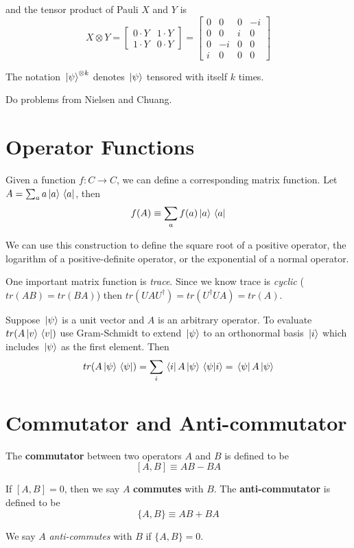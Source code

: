 and the tensor product of Pauli $X$ and $Y$ is 
$$X \otimes Y = \begin{bmatrix}
0 \cdot Y & 1 \cdot Y \\
1 \cdot Y & 0 \cdot Y
\end{bmatrix} = \begin{bmatrix}
0 & 0 & 0 & -i \\
0 & 0 & i & 0 \\
0 & -i & 0 & 0 \\
i & 0 & 0 & 0
\end{bmatrix}$$

The notation $\ket*{\psi}^{\otimes k}$ denotes $\ket*{\psi}$ tensored with itself $k$ times. 

Do problems from Nielsen and Chuang. 

\section{Operator Functions}

Given a function $f: C \rightarrow C$, we can define a corresponding matrix function. Let $A = \sum_{a} a \ket*{a} \bra*{a}$, then 
$$f(A) \equiv \sum_{a} f(a) \ket*{a} \bra*{a}$$

We can use this construction to define the square root of a positive operator, the logarithm of a positive-definite operator, or the exponential of a normal operator. 

One important matrix function is \textit{trace}. Since we know trace is \textit{cyclic} ($tr(AB) = tr(BA)$) then $tr(UAU^{\dagger}) = tr(U^{\dagger}UA) = tr(A)$. 

Suppose $\ket*{\psi}$ is a unit vector and $A$ is an arbitrary operator. To evaluate $tr(A\ket*{v} \bra*{v})$ use Gram-Schmidt to extend $\ket*{\psi}$ to an orthonormal basis $\ket*{i}$ which includes $\ket*{\psi}$ as the first element. Then 
$$tr(A \ket*{\psi} \bra*{\psi}) = \sum_{i} \bra*{i}A\ket*{\psi} \bra*{\psi}\ket*{i} = \bra*{\psi}A\ket*{\psi}$$

\section{Commutator and Anti-commutator} 

\begin{definition}
The \textbf{commutator} between two operators $A$ and $B$ is defined to be 
$$[A, B] \equiv AB - BA$$

If $[A, B] = 0$, then we say $A$ \textbf{commutes} with $B$. The \textbf{anti-commutator} is defined to be 
$$\{A, B\} \equiv AB + BA$$

We say $A$ \textit{anti-commutes} with $B$ if $\{ A, B\} = 0$.
\end{definition}

